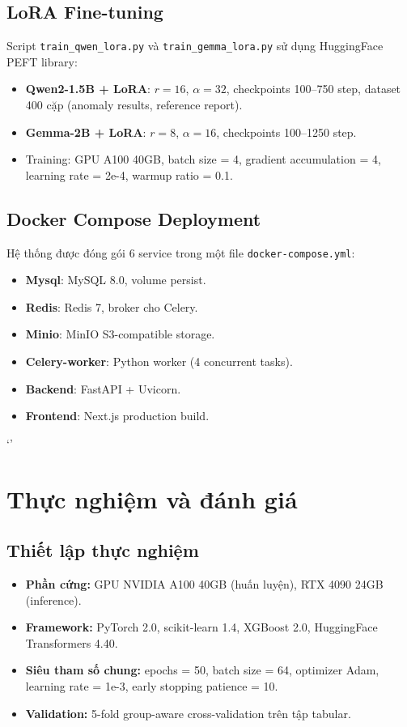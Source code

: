 \subsection{LoRA Fine-tuning}

Script \texttt{train\_qwen\_lora.py} và \texttt{train\_gemma\_lora.py} sử dụng HuggingFace PEFT library:
\begin{itemize}
  \item \textbf{Qwen2-1.5B + LoRA}: $r = 16$, $\alpha = 32$, checkpoints 100--750 step, dataset 400 cặp (anomaly results, reference report).
  \item \textbf{Gemma-2B + LoRA}: $r = 8$, $\alpha = 16$, checkpoints 100--1250 step.
  \item Training: GPU A100 40GB, batch size = 4, gradient accumulation = 4, learning rate = 2e-4, warmup ratio = 0.1.
\end{itemize}

\subsection{Docker Compose Deployment}

Hệ thống được đóng gói 6 service trong một file \texttt{docker-compose.yml}:

\begin{itemize}
  \item \textbf{Mysql}: MySQL 8.0, volume persist.
  \item \textbf{Redis}: Redis 7, broker cho Celery.
  \item \textbf{Minio}: MinIO S3-compatible storage.
  \item \textbf{Celery-worker}: Python worker (4 concurrent tasks).
  \item \textbf{Backend}: FastAPI + Uvicorn.
  \item \textbf{Frontend}: Next.js production build.
\end{itemize}`'

\section{Thực nghiệm và đánh giá}

\subsection{Thiết lập thực nghiệm}

\begin{itemize}
  \item \textbf{Phần cứng:} GPU NVIDIA A100 40GB (huấn luyện), RTX 4090 24GB (inference).
  \item \textbf{Framework:} PyTorch 2.0, scikit-learn 1.4, XGBoost 2.0, HuggingFace Transformers 4.40.
  \item \textbf{Siêu tham số chung:} epochs = 50, batch size = 64, optimizer Adam, learning rate = 1e-3, early stopping patience = 10.
  \item \textbf{Validation:} 5-fold group-aware cross-validation trên tập tabular.
\end{itemize}

